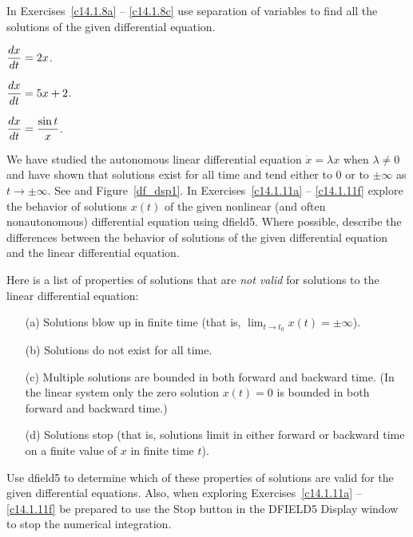 \noindent In Exercises~\ref{c14.1.8a} -- \ref{c14.1.8c} use separation 
of variables to find all the solutions of the given differential equation.
\begin{exercise}  \label{c14.1.8a}
$\displaystyle \frac{dx}{dt} = 2x$.
\end{exercise}
\begin{exercise}  \label{c14.1.8b}
$\displaystyle \frac{dx}{dt} = 5x+2$.
\end{exercise}
\begin{exercise}  \label{c14.1.8c}
$\displaystyle \frac{dx}{dt} = \frac{\sin t}{x}$.
\end{exercise}

\CEXER

\noindent We have studied the autonomous linear differential equation 
$\dot{x}=\lambda x$ when $\lambda\neq 0$ and have shown that solutions 
exist for all time and tend either to $0$ or to $\pm\infty$ as $t\to\pm\infty$.
See  and Figure~\ref{df_dsp1}.  In Exercises~\ref{c14.1.11a} -- 
\ref{c14.1.11f} explore the behavior of solutions $x(t)$ of the given 
nonlinear (and often nonautonomous) differential equation using {\sf dfield5}.  
Where possible, describe the differences between the behavior of solutions of 
the given differential equation and the linear differential equation.  

  Here is a list of properties of solutions that are 
{\em not valid\/} for solutions to the linear differential equation:
\begin{itemize}
\item[(a)]  Solutions blow up in finite time (that is, 
$\lim_{t\to t_0}x(t)=\pm\infty$).
\item[(b)]  Solutions do not exist for all time.
\item[(c)]  Multiple solutions are bounded in both forward and backward time.
(In the linear system only the zero solution $x(t)=0$ is bounded in both 
forward and backward time.)
\item[(d)]  Solutions stop (that is, solutions limit in either forward or 
backward time on a finite value of $x$ in finite time $t$).
\end{itemize}
Use {\sf dfield5} to determine which of these properties of solutions are 
valid for the given differential equations.  Also, when exploring 
Exercises~\ref{c14.1.11a} -- \ref{c14.1.11f} be prepared to use the {\sf Stop}
button in the {\sf DFIELD5 Display} window to stop the numerical integration. 

